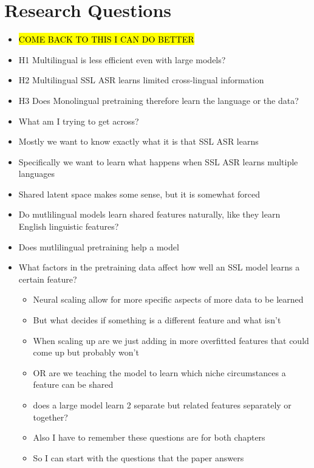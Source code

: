 \section{Research Questions}
\begin{itemize}
    \item \hl{COME BACK TO THIS I CAN DO BETTER}
    \item H1 Multilingual is less efficient even with large models?
    \item H2 Multilingual SSL ASR learns limited cross-lingual information
    \item H3 Does Monolingual pretraining therefore learn the language or the data?
\end{itemize}
\begin{itemize}
    \item What am I trying to get across?
    \item Mostly we want to know exactly what it is that SSL ASR learns
    \item Specifically we want to learn what happens when SSL ASR learns multiple languages
    \item Shared latent space makes some sense, but it is somewhat forced
    \item Do mutlilingual models learn shared features naturally, like they learn English linguistic features?
    \item Does mutlilingual pretraining help a model
    \item What factors in the pretraining data affect how well an SSL model learns a certain feature?
    \begin{itemize}
        \item Neural scaling allow for more specific aspects of more data to be learned
        \item But what decides if something is a different feature and what isn't
        \item When scaling up are we just adding in more overfitted features that could come up but probably won't
        \item OR are we teaching the model to learn which niche circumstances a feature can be shared
        \item does a large model learn 2 separate but related features separately or together?
        \item Also I have to remember these questions are for both chapters
        \item So I can start with the questions that the paper answers
    \end{itemize}
\end{itemize}
\fi

